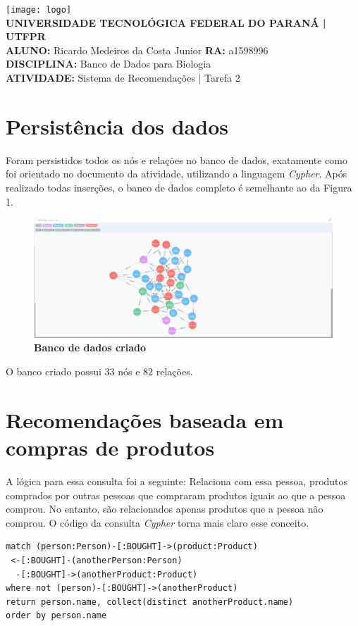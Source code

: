 \documentclass[a4paper, 12pt]{article}
\begin{document}
\lstset{language=SQL}
\begin{flushleft}\texttt{[image: logo]}\\
\textbf{UNIVERSIDADE TECNOLÓGICA FEDERAL DO PARANÁ | UTFPR} \\
\textbf{ALUNO:} Ricardo Medeiros da Costa Junior   \textbf{RA:} a1598996 \\
\textbf{DISCIPLINA:} Banco de Dados para Biologia \\
\textbf{ATIVIDADE:} Sistema de Recomendações | Tarefa 2 

\section{Persistência dos dados}
Foram persistidos todos os nós e relações no banco de dados, exatamente como foi orientado no documento da atividade, utilizando a linguagem \emph{Cypher}. Após realizado todas inserções, o banco de dados completo é semelhante ao da Figura 1. 

\begin{figure}[H]
  \centering
  \includegraphics[width=1\textwidth]{1}
  \caption[1 - Banco de dados criado]{\textbf{Banco de dados criado}}
\end{figure} 

O banco criado possui 33 nós e 82 relações.

\section{Recomendações baseada em compras de produtos}
A lógica para essa consulta foi a seguinte: Relaciona com essa pessoa, produtos comprados por outras pessoas que compraram produtos iguais ao que a pessoa comprou. No entanto, são relacionados apenas produtos que a pessoa não comprou. O código da consulta \emph{Cypher} torna mais claro esse conceito. 

\begin{lstlisting}[frame=single]
match (person:Person)-[:BOUGHT]->(product:Product)
 <-[:BOUGHT]-(anotherPerson:Person)
  -[:BOUGHT]->(anotherProduct:Product)
where not (person)-[:BOUGHT]->(anotherProduct)
return person.name, collect(distinct anotherProduct.name)
order by person.name
\end{lstlisting}


\end{flushleft}
\end{document}
